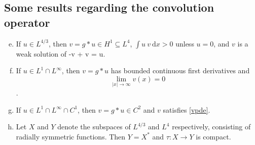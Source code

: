 \subsection{Some results regarding the convolution operator} 
\begin{enumerate}[a)] \setcounter{enumi}{4} 
    \item If $u\in L^{4/3}$, then $v = g\ast u \in H^1\subseteq L^4$, $\int u~v~\mathrm{d} x>0$ unless $u=0$, and $v$ is a weak solution of \be \label{vpde} -\Delta v + v = u. \ee 
    \item If $u \in L^1\cap L^\infty$, then $v = g\ast u$ has bounded continuous
        first derivatives and $$\underset{|x|\to\infty}{\lim} v(x) = 0$$.  
    \item If $u\in L^1\cap L^\infty\cap C^1$, then $v = g\ast u\in
        C^2$ and $v$ satisfies \eqref{vpde}.  
    \item Let $X$ and $Y$ denote the subspaces of $L^{4/3}$ and $L^4$ respectively, consisting of radially symmetric
functions. Then $Y = X^\ast$ and $\tau : X \to Y$ is compact.  
\end{enumerate}

